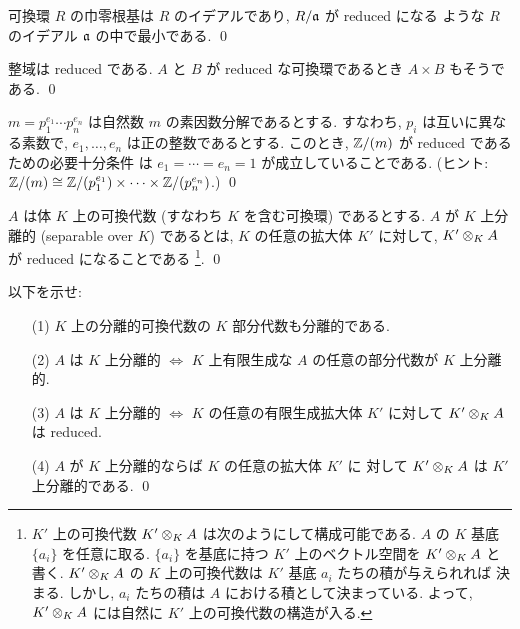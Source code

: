 \documentclass[12pt,twoside]{jarticle}
\begin{document}
\begin{question}
  可換環 $R$ の巾零根基は $R$ のイデアルであり, $R/{\mathfrak a}$ が reduced になる
  ような $R$ のイデアル ${\mathfrak a}$ の中で最小である. \qed
\end{question}

\begin{question}
  整域は reduced である.
  $A$ と $B$ が reduced な可換環であるとき $A\times B$ もそうである. \qed
\end{question}

\begin{question}
  $m=p_1^{e_1}\cdots p_n^{e_n}$ は自然数 $m$ の素因数分解であるとする.
  すなわち, $p_i$ は互いに異なる素数で,
  $e_1,\ldots,e_n$ は正の整数であるとする.
  このとき, ${\mathbb Z}/(m)$ が reduced であるための必要十分条件
  は $e_1=\cdots=e_n=1$ が成立していることである.  
  (ヒント: ${\mathbb Z}/(m)\cong{\mathbb Z}/(p_1^{e_1})\times\cdots\times{\mathbb Z}/(p_n^{e_n})$.)
  \qed
\end{question}

\begin{definition}\label{definition:separable}
  $A$ は体 $K$ 上の可換代数 (すなわち $K$ を含む可換環) であるとする.
  $A$ が $K$ 上分離的 (separable over $K$) であるとは,
  $K$ の任意の拡大体 $K'$ に対して, $K'\otimes_K A$ が reduced になることである%
  \footnote{$K'$ 上の可換代数 $K'\otimes_K A$ は次のようにして構成可能である.
    $A$ の $K$ 基底 $\{a_i\}$ を任意に取る.
    $\{a_i\}$ を基底に持つ $K'$ 上のベクトル空間を $K'\otimes_K A$ と書く.
    $K'\otimes_K A$ の $K$ 上の可換代数は $K'$ 基底 $a_i$ たちの積が与えられれば
    決まる. しかし, $a_i$ たちの積は $A$ における積として決まっている.
    よって, $K'\otimes_K A$ には自然に $K'$ 上の可換代数の構造が入る.}.
  \qed
\end{definition}

\begin{question}\label{q:sep-1}
  以下を示せ:
  \begin{itemize}
  \item[(1)] $K$ 上の分離的可換代数の $K$ 部分代数も分離的である.
  \item[(2)] $A$ は $K$ 上分離的 $\iff$
    $K$ 上有限生成な $A$ の任意の部分代数が $K$ 上分離的.
  \item[(3)] $A$ は $K$ 上分離的 $\iff$
    $K$ の任意の有限生成拡大体 $K'$ に対して $K'\otimes_K A$ は reduced.
  \item[(4)] $A$ が $K$ 上分離的ならば $K$ の任意の拡大体 $K'$ に
    対して $K'\otimes_K A$ は $K'$ 上分離的である.
    \qed
  \end{itemize}
\end{question}
\end{document}
